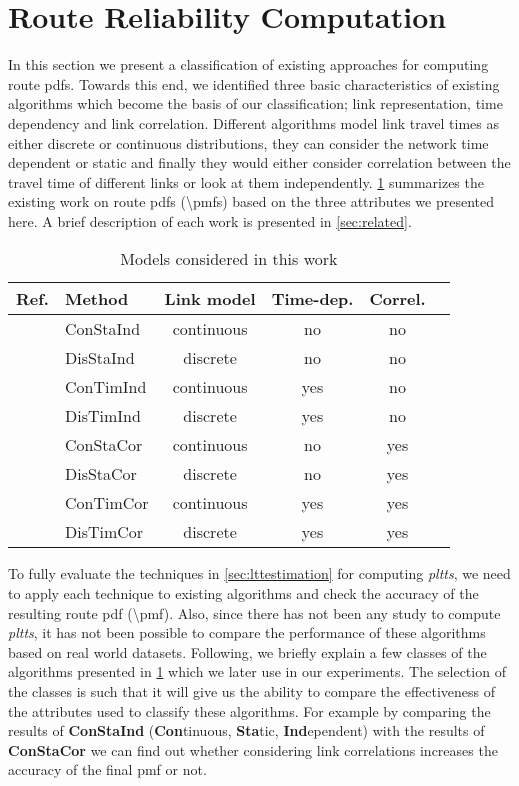 \section{Route Reliability Computation}
\label{sec:methods}
In this section we present a classification of existing approaches for computing route pdfs. Towards this end, we identified three basic characteristics of existing algorithms which become the basis of our classification; link representation, time dependency and link correlation. Different algorithms model link travel times as either discrete or continuous distributions, they can consider the network time dependent or static and finally they would either consider correlation between the travel time of different links or look at them independently. \cref{tab:methods} summarizes the existing work on route pdfs (\textbackslash pmfs) based on the three attributes we presented here. A brief description of each work is presented in \cref{sec:related}.

\begin{table}
\centering
\begin{tabular}{| l || l | c | c | c | c|}
\hline
Ref. & Method & Link model & Time-dep. & Correl. \\
\hline    \hline
\cite{Frank69} & ConStaInd & continuous  & no & no\\ \hline
               & DisStaInd & discrete & no & no\\ \hline
               & ConTimInd & continuous & yes & no\\ \hline
\cite{Miller-Hooks98,Miller-Hooks00, Nie09b} & DisTimInd & discrete & yes & no\\ \hline
\cite{Seshadri10, Zockaei13,Bi-Yu13} & ConStaCor & continuous & no & yes\\ \hline
\cite{Nie06,Hua10,Fan05} & DisStaCor & discrete & no & yes\\ \hline
\cite{Dong12} & ConTimCor & continuous & yes & yes\\ \hline
\cite{Nie09a} & DisTimCor & discrete & yes & yes\\ \hline
\end{tabular}
\caption{Models considered in this work}
\label{tab:methods}
\end{table}

To fully evaluate the techniques in \cref{sec:lttestimation} for computing \textit{pltts}, we need to apply each technique to existing algorithms and check the accuracy of the resulting route pdf (\textbackslash pmf). Also, since there has not been any study to compute \textit{pltts}, it has not been possible to compare the performance of these algorithms based on real world datasets. Following, we briefly explain a few classes of the algorithms presented in \cref{tab:methods} which we later use in our experiments. The selection of the classes is such that it will give us the ability to compare the effectiveness of the attributes used to classify these algorithms. For example by comparing the results of \textbf{ConStaInd} (\textbf{Con}tinuous, \textbf{Sta}tic, \textbf{Ind}ependent) with the results of \textbf{ConStaCor} we can find out whether considering link correlations increases the accuracy of the final pmf or not.

